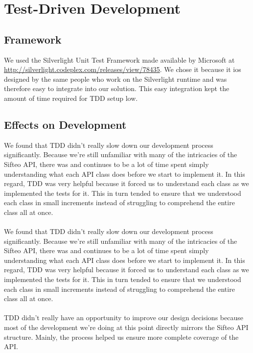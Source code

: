 \documentclass[12pt]{article}
\begin{document}
\section*{Test-Driven Development}

\subsection*{Framework}
We used the Silverlight Unit Test Framework made available by Microsoft at \\ \underline{http://silverlight.codeplex.com/releases/view/78435}. We chose it because it ios designed by the same people who work on the Silverlight runtime and was therefore easy to integrate into our solution. This easy integration kept the amount of time required for TDD setup low.

\subsection*{Effects on Development}
We found that TDD didn't really slow down our development process significantly. Because we're still unfamiliar with many of the intricacies of the Sifteo API, there was and continues to be a lot of time spent simply understanding what each API class does before we start to implement it. In this regard, TDD was very helpful because it forced us to understand each class as we implemented the tests for it. This in turn tended to ensure that we understood each class in small increments instead of struggling to comprehend the entire class all at once.
\\\\
We found that TDD didn't really slow down our development process significantly. Because we're still unfamiliar with many of the intricacies of the Sifteo API, there was and continues to be a lot of time spent simply understanding what each API class does before we start to implement it. In this regard, TDD was very helpful because it forced us to understand each class as we implemented the tests for it. This in turn tended to ensure that we understood each class in small increments instead of struggling to comprehend the entire class all at once.
\\\\
TDD didn't really have an opportunity to improve our design decisions because most of the development we're doing at this point directly mirrors the Sifteo API structure. Mainly, the process helped us ensure more complete coverage of the API.

        
\end{document}

